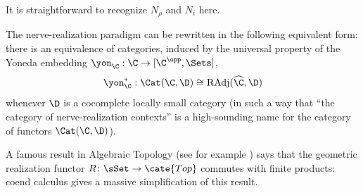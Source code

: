It is straightforward to recognize $N_\rho$ and $N_i$ here.
\begin{remark}
The nerve\hyp{}realization paradigm can be rewritten in the following equivalent form: there is an equivalence of categories, induced by the universal property of the Yoneda embedding $\yon_\C : \C \to [\C^\opp,\Sets]$, 
\[
\yon_\C^* : \Cat(\C, \D)\cong \text{RAdj}(\widehat{\C}, \D)
\]
whenever $\D$ is a cocomplete locally small category (in such a way that ``the category of nerve\hyp{}realization contexts'' is a high-sounding name for the category of functors $\Cat(\C, \D)$).
\end{remark}
A famous result in Algebraic Topology (see for example \cite{GZ, GoJ}) says that the geometric realization functor $R\colon \sSet\to\cate{Top}$ commutes with finite products: coend calculus gives a massive simplification of this result.
